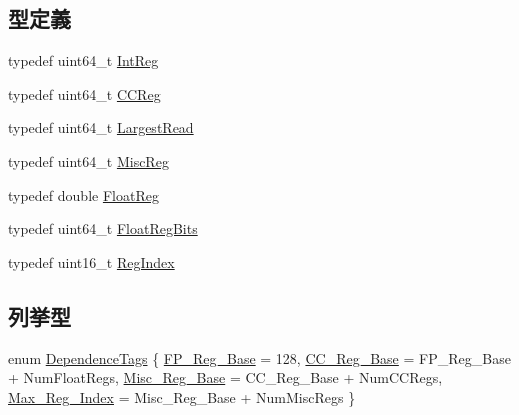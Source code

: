 \subsection*{型定義}
\begin{DoxyCompactItemize}
\item 
typedef uint64\_\-t \hyperlink{namespaceX86ISA_a0e080577527fb3e9685399f75b5caf15}{IntReg}
\item 
typedef uint64\_\-t \hyperlink{namespaceX86ISA_aaefa29979e267ea80ed6b82756284354}{CCReg}
\item 
typedef uint64\_\-t \hyperlink{namespaceX86ISA_a13e8c318dd29afdaf79751a072344db8}{LargestRead}
\item 
typedef uint64\_\-t \hyperlink{namespaceX86ISA_aa16539aa6584fd12f7d6fa868f75b4de}{MiscReg}
\item 
typedef double \hyperlink{namespaceX86ISA_a06fae4f187c7c94b8b0046dd6802be48}{FloatReg}
\item 
typedef uint64\_\-t \hyperlink{namespaceX86ISA_a6905e424d12491fe126e1a22a9c8d655}{FloatRegBits}
\item 
typedef uint16\_\-t \hyperlink{namespaceX86ISA_a69329e1d929a534ff51be6cf8216b69a}{RegIndex}
\end{DoxyCompactItemize}
\subsection*{列挙型}
\begin{DoxyCompactItemize}
\item 
enum \hyperlink{namespaceX86ISA_a4720195f4575f008ac78181d27db827e}{DependenceTags} \{ \hyperlink{namespaceX86ISA_a4720195f4575f008ac78181d27db827ea23c089ac23981fe820094e2fc1579bf4}{FP\_\-Reg\_\-Base} =  128, 
\hyperlink{namespaceX86ISA_a4720195f4575f008ac78181d27db827eae261857dbef59e0d93992a1e2d1fa322}{CC\_\-Reg\_\-Base} =  FP\_\-Reg\_\-Base + NumFloatRegs, 
\hyperlink{namespaceX86ISA_a4720195f4575f008ac78181d27db827ea0cbf9912f8507e55495a158f1b94f803}{Misc\_\-Reg\_\-Base} =  CC\_\-Reg\_\-Base + NumCCRegs, 
\hyperlink{namespaceX86ISA_a4720195f4575f008ac78181d27db827ea0693397933007a82bea39457bd7a7151}{Max\_\-Reg\_\-Index} =  Misc\_\-Reg\_\-Base + NumMiscRegs
 \}
\end{DoxyCompactItemize}
